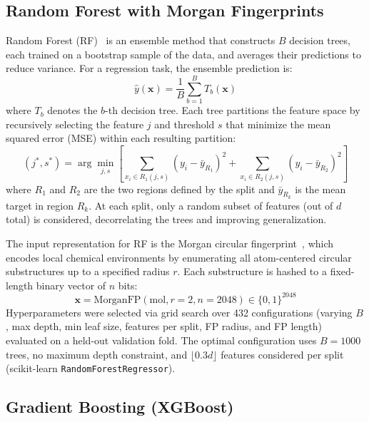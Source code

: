 \documentclass[journal=jcisd8,manuscript=article]{achemso}
\newcommand{\vect}[1]{\mathbf{#1}}
\begin{document}
\FloatBarrier
\subsection{Random Forest with Morgan Fingerprints}
\label{sec:rf}

Random Forest (RF)~\cite{breiman2001random} is an ensemble method that constructs $B$ decision trees, each trained on a bootstrap sample of the data, and averages their predictions to reduce variance.
For a regression task, the ensemble prediction is:
\begin{equation}
    \hat{y}(\vect{x}) = \frac{1}{B} \sum_{b=1}^{B} T_b(\vect{x})
\end{equation}
where $T_b$ denotes the $b$-th decision tree.
Each tree partitions the feature space by recursively selecting the feature $j$ and threshold $s$ that minimize the mean squared error (MSE) within each resulting partition:
\begin{equation}
    (j^*, s^*) = \arg\min_{j, s} \left[ \sum_{x_i \in R_1(j,s)} (y_i - \bar{y}_{R_1})^2 + \sum_{x_i \in R_2(j,s)} (y_i - \bar{y}_{R_2})^2 \right]
\end{equation}
where $R_1$ and $R_2$ are the two regions defined by the split and $\bar{y}_{R_k}$ is the mean target in region $R_k$.
At each split, only a random subset of features (out of $d$ total) is considered, decorrelating the trees and improving generalization.

The input representation for RF is the Morgan circular fingerprint~\cite{rogers2010extended}, which encodes local chemical environments by enumerating all atom-centered circular substructures up to a specified radius $r$.
Each substructure is hashed to a fixed-length binary vector of $n$ bits:
\begin{equation}
    \vect{x} = \text{MorganFP}(\text{mol}, r=2, n=2048) \in \{0, 1\}^{2048}
\end{equation}
Hyperparameters were selected via grid search over 432 configurations (varying $B$, max depth, min leaf size, features per split, FP radius, and FP length) evaluated on a held-out validation fold.
The optimal configuration uses $B = 1000$ trees, no maximum depth constraint, and $\lfloor 0.3d \rfloor$ features considered per split (scikit-learn \texttt{RandomForestRegressor}).


\subsection{Gradient Boosting (XGBoost)}
\label{sec:xgboost}
\end{document}
